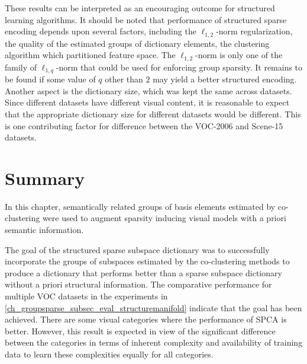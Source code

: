 These results can be interpreted as an encouraging outcome for structured learning algorithms. It should be noted that performance of structured sparse encoding depends upon several factors, including the $\ell_{1,2}$-norm regularization, the quality of the estimated groups of dictionary elements, the clustering algorithm which partitioned feature space. The $\ell_{1,2}$-norm is only one of the family of $\ell_{1,q}$-norm that could be used for enforcing group sparsity. It remains to be found if some value of $q$ other than $2$ may yield a better structured encoding. Another aspect is the dictionary size, which was kept the same across datasets. Since different datasets have different visual content, it is reasonable to expect that the appropriate dictionary size for different datasets would be different. This is one contributing factor for difference between the VOC-2006 and Scene-15 datasets. 

\section[Summary]{Summary}
\label{ch_groupsparse_sec_summary}

In this chapter, semantically related groups of basis elements estimated by co-clustering were used to augment sparsity inducing visual models with a priori semantic information.

The goal of the structured sparse subspace dictionary was to successfully incorporate the groups of subspaces estimated by the co-clustering methods to produce a dictionary that performs better than a sparse subspace dictionary without a priori structural information. The comparative performance for multiple VOC datasets in the experiments in \cref{ch_groupsparse_subsec_eval_structuremanifold} indicate that the goal has been achieved. There are some visual categories where the performance of SPCA is better. However, this result is expected in view of the significant difference between the categories in terms of inherent complexity and availability of training data to learn these complexities equally for all categories.

